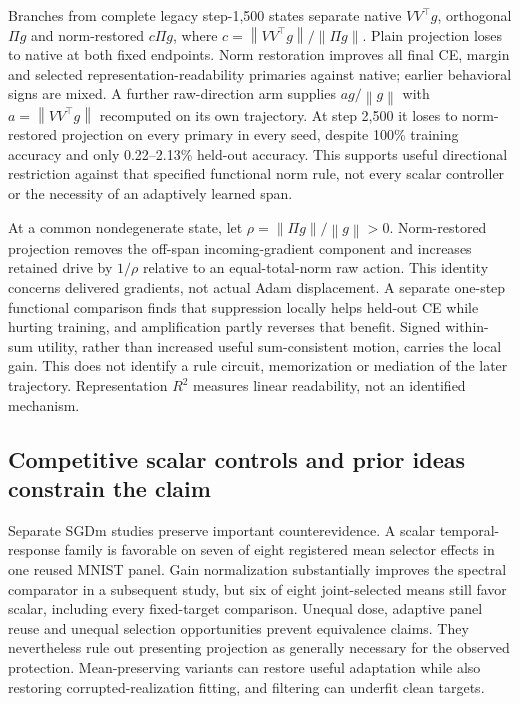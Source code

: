 \documentclass[10pt]{article}
\newcommand{\norm}[1]{\left\lVert#1\right\rVert}
\begin{document}
Branches from complete legacy step-1,500 states separate native $VV^\top g$, orthogonal $\Pi g$ and norm-restored $c\Pi g$, where $c=\norm{VV^\top g}/\norm{\Pi g}$. Plain projection loses to native at both fixed endpoints. Norm restoration improves all final CE, margin and selected representation-readability primaries against native; earlier behavioral signs are mixed. A further raw-direction arm supplies $a g/\norm{g}$ with $a=\norm{VV^\top g}$ recomputed on its own trajectory. At step 2,500 it loses to norm-restored projection on every primary in every seed, despite 100\% training accuracy and only 0.22--2.13\% held-out accuracy. This supports useful directional restriction against that specified functional norm rule, not every scalar controller or the necessity of an adaptively learned span.

At a common nondegenerate state, let $\rho=\norm{\Pi g}/\norm{g}>0$. Norm-restored projection removes the off-span incoming-gradient component and increases retained drive by $1/\rho$ relative to an equal-total-norm raw action. This identity concerns delivered gradients, not actual Adam displacement. A separate one-step functional comparison finds that suppression locally helps held-out CE while hurting training, and amplification partly reverses that benefit. Signed within-sum utility, rather than increased useful sum-consistent motion, carries the local gain. This does not identify a rule circuit, memorization or mediation of the later trajectory. Representation $R^2$ measures linear readability, not an identified mechanism.

\subsection{Competitive scalar controls and prior ideas constrain the claim}
Separate SGDm studies preserve important counterevidence. A scalar temporal-response family is favorable on seven of eight registered mean selector effects in one reused MNIST panel. Gain normalization substantially improves the spectral comparator in a subsequent study, but six of eight joint-selected means still favor scalar, including every fixed-target comparison. Unequal dose, adaptive panel reuse and unequal selection opportunities prevent equivalence claims. They nevertheless rule out presenting projection as generally necessary for the observed protection. Mean-preserving variants can restore useful adaptation while also restoring corrupted-realization fitting, and filtering can underfit clean targets.
\end{document}
